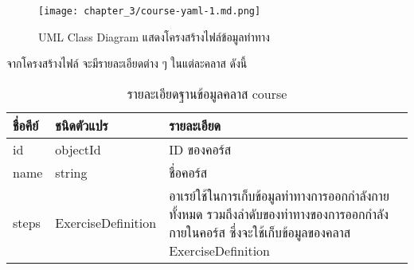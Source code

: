 \begin{figure}
    \texttt{[image: chapter\_3/course-yaml-1.md.png]}
    \caption{UML Class Diagram แสดงโครงสร้างไฟล์ข้อมูลท่าทาง}
\end{figure}
\clearpage
จากโครงสร้างไฟล์ จะมีรายละเอียดต่าง ๆ ในแต่ละคลาส ดังนี้
\begin{table}
    \caption{รายละเอียดฐานข้อมูลคลาส course}
    \begin{tabularx}{\textwidth}{ | l | l | X | }
        \hline
        \bf ชื่อคีย์			& \bf ชนิดตัวแปร       & \bf รายละเอียด    \\\hline
        id                  & objectId           & ID ของคอร์ส       \\\hline
        name                & string             & ชื่อคอร์ส            \\\hline
        steps               & ExerciseDefinition & อาเรย์ใช้ในการเก็บข้อมูลท่าทางการออกกำลังกายทั้งหมด รวมถึงลำดับของท่าทางของการออกกำลังกายในคอร์ส ซึ่งจะใช้เก็บข้อมูลของคลาส ExerciseDefinition \\\hline
    \end{tabularx}
\end{table}

